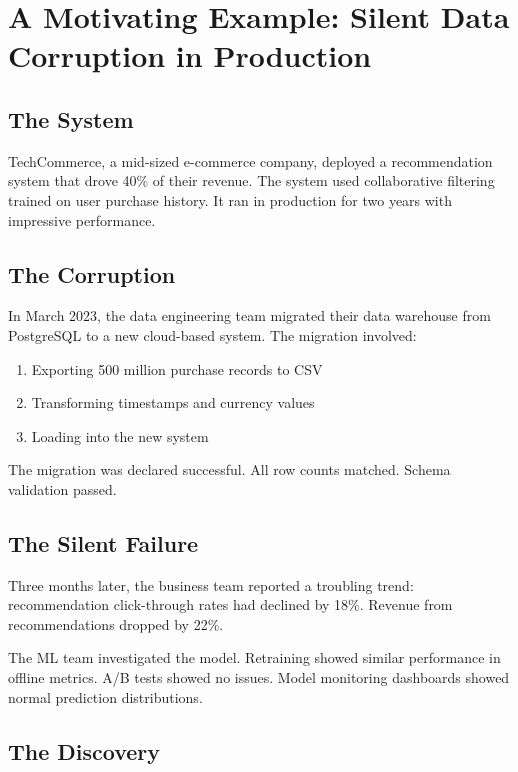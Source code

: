 \section{A Motivating Example: Silent Data Corruption in Production}

\subsection{The System}

TechCommerce, a mid-sized e-commerce company, deployed a recommendation system that drove 40\% of their revenue. The system used collaborative filtering trained on user purchase history. It ran in production for two years with impressive performance.

\subsection{The Corruption}

In March 2023, the data engineering team migrated their data warehouse from PostgreSQL to a new cloud-based system. The migration involved:

\begin{enumerate}
    \item Exporting 500 million purchase records to CSV
    \item Transforming timestamps and currency values
    \item Loading into the new system
\end{enumerate}

The migration was declared successful. All row counts matched. Schema validation passed.

\subsection{The Silent Failure}

Three months later, the business team reported a troubling trend: recommendation click-through rates had declined by 18\%. Revenue from recommendations dropped by 22\%.

The ML team investigated the model. Retraining showed similar performance in offline metrics. A/B tests showed no issues. Model monitoring dashboards showed normal prediction distributions.

\subsection{The Discovery}

